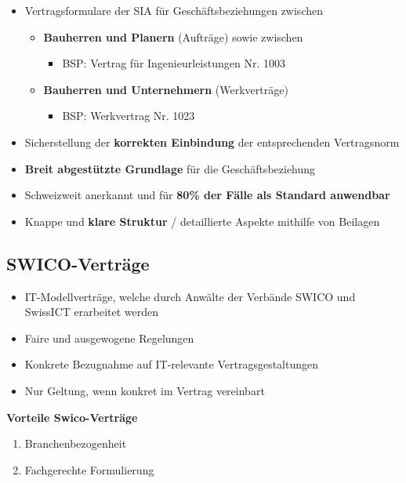 \begin{itemize}
	\tightlist
	\item Vertragsformulare der SIA für Geschäftsbeziehungen zwischen
	\begin{itemize}
		\tightlist
		\item \textbf{Bauherren und Planern} (Aufträge) sowie zwischen
		\begin{itemize}
			\tightlist
			\item BSP: Vertrag für Ingenieurleistungen Nr. 1003
		\end{itemize}
		\item \textbf{Bauherren und Unternehmern} (Werkverträge)
		\begin{itemize}
			\tightlist
			\item BSP: Werkvertrag Nr. 1023
		\end{itemize}
	\end{itemize}
	\item Sicherstellung der \textbf{korrekten Einbindung} der entsprechenden
	Vertragsnorm
	\item \textbf{Breit abgestützte Grundlage} für die Geschäftsbeziehung
	\item Schweizweit anerkannt und für \textbf{80\% der Fälle als Standard
	anwendbar}
	\item Knappe und \textbf{klare Struktur} / detaillierte Aspekte mithilfe von
	Beilagen
\end{itemize}

\subsection{SWICO-Verträge}

\begin{itemize}
	\tightlist
	\item IT-Modellverträge, welche durch Anwälte der Verbände SWICO und
	SwissICT erarbeitet werden
	\item Faire und ausgewogene Regelungen
	\item Konkrete Bezugnahme auf IT-relevante Vertragsgestaltungen
	\item Nur Geltung, wenn konkret im Vertrag vereinbart
\end{itemize}

\textbf{Vorteile Swico-Verträge}

\begin{enumerate}
	\tightlist
	\item Branchenbezogenheit
	\item Fachgerechte Formulierung
\end{enumerate}
